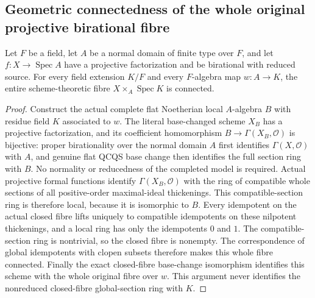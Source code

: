 \subsection{Geometric connectedness of the whole original projective birational fibre}

\begin{theorem}
\label{thm:fc-projective-birational-field-fibre-connected}
\leanok
{}
Let $F$ be a field, let $A$ be a normal domain of finite type over $F$,
and let $f:X\to\operatorname{Spec}A$ have a projective factorization and
be birational with reduced source. For every field extension $K/F$ and
every $F$-algebra map $w:A\to K$, the entire scheme-theoretic fibre
$X\times_A\operatorname{Spec}K$ is connected.
\end{theorem}
\begin{proof}
Construct the actual complete flat Noetherian local $A$-algebra $B$ with
residue field $K$ associated to $w$. The literal base-changed scheme
$X_B$ has a projective factorization, and its coefficient homomorphism
$B\to\Gamma(X_B,\mathcal O)$ is bijective: proper birationality over the
normal domain $A$ first identifies $\Gamma(X,\mathcal O)$ with $A$, and
genuine flat QCQS base change then identifies the full section ring with
$B$. No normality or reducedness of the completed model is required.
Actual projective formal functions identify $\Gamma(X_B,\mathcal O)$
with the ring of compatible whole sections of all positive-order
maximal-ideal thickenings. This compatible-section ring is therefore
local, because it is isomorphic to $B$. Every idempotent on the actual
closed fibre lifts uniquely to compatible idempotents on these
nilpotent thickenings, and a local ring has only the idempotents $0$ and
$1$. The compatible-section ring is nontrivial, so the closed fibre is
nonempty. The correspondence of global idempotents with clopen subsets
therefore makes this whole fibre connected. Finally the exact
closed-fibre base-change isomorphism identifies this scheme with the
whole original fibre over $w$. This argument never identifies the
nonreduced closed-fibre global-section ring with $K$.
\end{proof}

